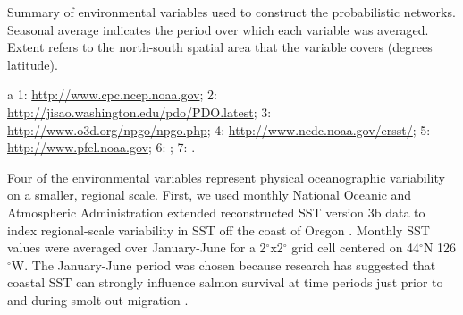 \begin{table}[htbp]
  \small \centering \libertineLF
  \caption[Summary of environmental variables used to construct the
           probabilistic networks]{Summary of environmental variables used to
           construct the probabilistic networks. Seasonal average indicates
           the period over which each variable was averaged. Extent refers to
           the north-south spatial area that the variable covers (degrees
           latitude).}
  \begin{threeparttable}
    
    \begin{tablenotes}
      {\footnotesize
        \item[a] 1: \url{http://www.cpc.ncep.noaa.gov};
                 2: \url{http://jisao.washington.edu/pdo/PDO.latest};
                 3: \url{http://www.o3d.org/npgo/npgo.php};
                 4: \url{http://www.ncdc.noaa.gov/ersst/};
                 5: \url{http://www.pfel.noaa.gov};
                 6: \citet{Peterson2012a};
                 7: \citet{PFMC2013}.
        }
    \end{tablenotes}
  \end{threeparttable}
  \label{tab:bn:1}
\end{table}

Four of the environmental variables represent physical oceanographic variability
on a smaller, regional scale. First, we used monthly National Oceanic and
Atmospheric Administration extended reconstructed SST version 3b data to index
regional-scale variability in SST off the coast of Oregon \citep{Smith2008a}.
Monthly SST values were averaged over January-June for a 2$^{\circ}$x2$^{\circ}$
grid cell centered on 44$^{\circ}$N 126$^{\circ}$W. The January-June period was
chosen because research has suggested that coastal SST can strongly influence
salmon survival at time periods just prior to and during smolt out-migration
\citep{Mueter2005a}.


